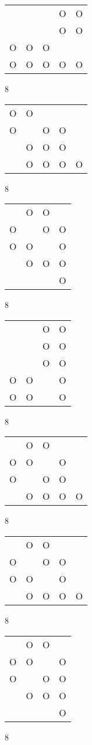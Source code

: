 \begin{tabular}{|m{0.2cm}m{0.2cm}m{0.2cm}m{0.2cm}m{0.2cm}|}\hline
 & & &O&O\\
 & & &O&O\\
O&O&O& & \\
O&O&O&O&O\\
\hline\end{tabular}8
\begin{tabular}{|m{0.2cm}m{0.2cm}m{0.2cm}m{0.2cm}m{0.2cm}|}\hline
O&O& & & \\
O& &O&O& \\
 &O&O&O& \\
 &O&O&O&O\\
\hline\end{tabular}8
\begin{tabular}{|m{0.2cm}m{0.2cm}m{0.2cm}m{0.2cm}|}\hline
 &O&O& \\
O& &O&O\\
O&O& &O\\
 &O&O&O\\
 & & &O\\
\hline\end{tabular}8
\begin{tabular}{|m{0.2cm}m{0.2cm}m{0.2cm}m{0.2cm}|}\hline
 & &O&O\\
 & &O&O\\
 & &O&O\\
O&O& &O\\
O&O& &O\\
\hline\end{tabular}8
\begin{tabular}{|m{0.2cm}m{0.2cm}m{0.2cm}m{0.2cm}m{0.2cm}|}\hline
 &O&O& & \\
O&O& &O& \\
O& &O&O& \\
 &O&O&O&O\\
\hline\end{tabular}8
\begin{tabular}{|m{0.2cm}m{0.2cm}m{0.2cm}m{0.2cm}m{0.2cm}|}\hline
 &O&O& & \\
O& &O&O& \\
O&O& &O& \\
 &O&O&O&O\\
\hline\end{tabular}8
\begin{tabular}{|m{0.2cm}m{0.2cm}m{0.2cm}m{0.2cm}|}\hline
 &O&O& \\
O&O& &O\\
O& &O&O\\
 &O&O&O\\
 & & &O\\
\hline\end{tabular}8
